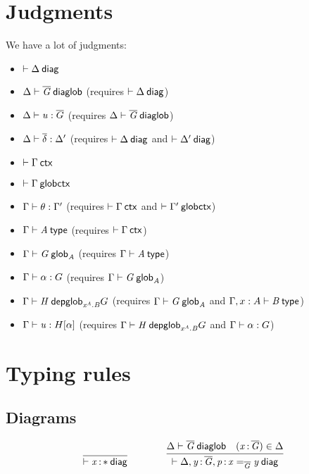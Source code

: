 \newcommand\diagbase[0]{\ensuremath{\mathord{*}}}
\newcommand\interpdiag[2]{\ensuremath{[ #1 ]_{#2}}}

\section{Judgments}

We have a lot of judgments:

\begin{itemize}
\item $\wfdiag{\Delta}$
\item $\wfdiaglob{\Delta}{\diag G}$ (requires $\wfdiag{\Delta}$)
\item $\ofdiaglob{\Delta}{u}{\diag G}$ (requires $\wfdiaglob{\Delta}{\diag G}$)
\item $\substdiaglob{\Delta}{\diag \delta}{\Delta'}$ (requires $\wfdiag{\Delta}$
  and $\wfdiag{\Delta'}$)
\item $\wfctx{\Gamma}$
\item $\wfglobctx{\Gamma}$
\item $\wfsub{\Gamma}{\theta}{\Gamma'}$ (requires $\wfctx{\Gamma}$ and
  $\wfglobctx{\Gamma'}$)
\item $\wftype{\Gamma}{A}$ (requires $\wfctx{\Gamma}$)
\item $\wfglob{\Gamma}{G}{}{A}$ (requires $\wftype{\Gamma}{A}$)
\item $\ofglob{\Gamma}{\alpha}{G}$ (requires $\wfglob{\Gamma}{G}{}{A}$)
\item $\wfdepglob{\Gamma}{H}{}{x^A.B}{G}$ (requires $\wfglob{\Gamma}{G}{}{A}$
  and $\wftype{\Gamma,x:A}{B}$)
\item $\ofdepglob{\Gamma}{u}{H}{\alpha}$ (requires
  $\wfdepglob{\Gamma}{H}{}{x^A.B}{G}$ and $\ofglob{\Gamma}{\alpha}{G}$)
\end{itemize}

\section{Typing rules}

\subsection{Diagrams}

\begin{small}
  \[
  \infer{\wfdiag{\tptm{x}{\diagbase}}}{}
  \qquad\qquad
  \infer{\wfdiag{\Delta,\tptm{y}{\diag G},\tptm{p}{\homj{\diag{G}}{x}{y}}}}
  {\wfdiaglob{\Delta}{\diag G}
    & (\tptm{x}{\diag{G}}) \in \Delta}\]
\end{small}

